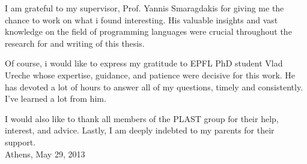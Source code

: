 I am grateful to my supervisor, Prof. Yannis Smaragdakis for giving me the chance to work on what i found interesting. His valuable insights and vast knowledge on the field of programming languages were crucial throughout the research for and writing of this thesis.

Of course, i would like to express my gratitude to EPFL PhD student Vlad Ureche whose expertise, guidance, and patience were decisive for this work. He has devoted a lot of hours to answer all of my questions, timely and consistently. I've learned a lot from him.

I would also like to thank all members of the PLAST group for their help, interest, and advice. Lastly, I
am deeply indebted to my parents for their support.\\

\hfill{Athens,  May 29, 2013}


